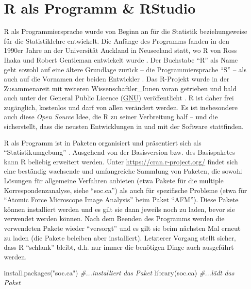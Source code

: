 \documentclass[
]{book}
\newenvironment{Shaded}{\begin{snugshade}}{\end{snugshade}}
\newcommand{\CommentTok}[1]{\textcolor[rgb]{0.56,0.35,0.01}{\textit{#1}}}
\newcommand{\FunctionTok}[1]{\textcolor[rgb]{0.00,0.00,0.00}{#1}}
\newcommand{\NormalTok}[1]{#1}
\newcommand{\StringTok}[1]{\textcolor[rgb]{0.31,0.60,0.02}{#1}}
\begin{document}
\hypertarget{r-als-programm-rstudio}{%
\section{R als Programm \& RStudio}\label{r-als-programm-rstudio}}

R als Programmiersprache wurde von Beginn an für die Statistik beziehungsweise für die Statistiklehre entwickelt. Die Anfänge des Programms fanden in den 1990er Jahre an der Universität Auckland in Neuseeland statt, wo R von Ross Ihaka und Robert Gentleman entwickelt wurde \citep[1]{Manderscheid2017}. Der Buchstabe ``R'' als Name geht sowohl auf eine ältere Grundlage zurück -- die Programmiersprache ``S'' -- als auch auf die Vornamen der beiden Entwickler \citep[ebd., vgl. auch][13f]{Sauer2019}. Das R-Projekt wurde in der Zusammenareit mit weiteren Wissenschaftler\_Innen voran getrieben und bald auch unter der General Public Licence (\href{https://en.wikipedia.org/wiki/GNU}{GNU}) veröffentlicht \citep[1]{Manderscheid2017}. R ist daher frei zugänglich, kostenlos und darf von allen verändert werden. Es ist insbesondere auch diese \emph{Open Source} Idee, die R zu seiner Verbreitung half -- und die sicherstellt, dass die neusten Entwicklungen in und mit der Software stattfinden.

R als Programm ist in Paketen organisiert und präsentiert sich als ``Statistikumgebung'' \citep[1]{Manderscheid2017}. Ausgehend von der Basisversion bzw. des Basispaketes kann R beliebig erweitert werden. Unter \url{https://cran.r-project.org/} findet sich eine beständig wachsende und umfangreiche Sammlung von Paketen, die sowohl Lösungen für allgemeine Verfahren anbieten (etwa Pakete für die multiple Korrespondenzanalyse, siehe ``soc.ca'') als auch für spezifische Probleme (etwa für ``Atomic Force Microscope Image Analysis'' beim Paket ``AFM''). Diese Pakete können installiert werden und es gilt sie dann jeweils noch zu laden, bevor sie verwendet werden können. Nach dem Beenden des Programms werden die verwendeten Pakete wieder ``versorgt'' und es gilt sie beim nächsten Mal erneut zu laden (die Pakete beleiben aber installiert). Letzterer Vorgang stellt sicher, dass R ``schlank'' bleibt, d.h. nur immer die benötigen Dinge auch ausgeführt werden.

\begin{Shaded}
\begin{Highlighting}[]
\FunctionTok{install.packages}\NormalTok{(}\StringTok{"soc.ca"}\NormalTok{) }\CommentTok{\#...installiert das Paket}
\FunctionTok{library}\NormalTok{(soc.ca) }\CommentTok{\#...lädt das Paket}
\end{Highlighting}
\end{Shaded}
\end{document}
